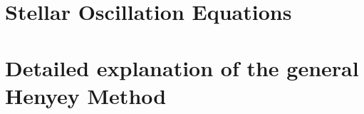 \documentclass[11pt]{amsart}
\begin{document}











\newpage

\appendix

\section{Stellar Oscillation Equations} \label{ap:Osc}


\section{Detailed explanation of the general Henyey Method}   \label{ap:Henyey}
\end{document}
